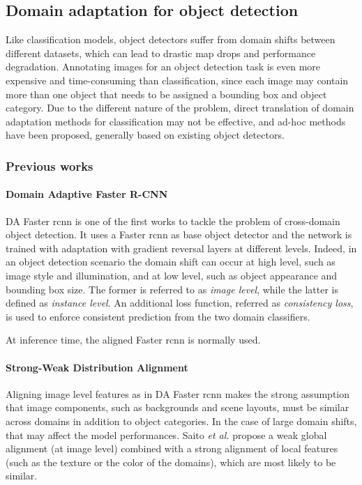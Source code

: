 \documentclass[%
    corpo=12pt,
    twoside,
    stile=classica,   
    tipotesi=magistrale,
    evenboxes,
    english
]{toptesi}
\begin{document}
\subsection{Domain adaptation for object detection}
Like classification models, object detectors suffer from domain shifts between different datasets, which can lead to drastic \gls{map} drops and performance degradation. Annotating images for an object detection task is even more expensive and time-consuming than classification, since each image may contain more than one object that needs to be assigned a bounding box and object category. Due to the different nature of the problem, direct translation of domain adaptation methods for classification may not be effective, and ad-hoc methods have been proposed, generally based on existing object detectors.

\subsubsection{Previous works}
\paragraph{Domain Adaptive Faster R-CNN}\label{sec:dafrcnn}
DA Faster \acrshort{rcnn}\cite{chen2018domain} is one of the first works to tackle the problem of cross-domain object detection. It uses a Faster \acrshort{rcnn} as base object detector and the network is trained with adaptation with gradient reversal layers at different levels. Indeed, in an object detection scenario the domain shift can occur at high level, such as image style and illumination, and at low level, such as object appearance and bounding box size. The former is referred to as \textit{image level}, while the latter is defined as \textit{instance level}. An additional loss function, referred as \textit{consistency loss}, is used to enforce consistent prediction from the two domain classifiers.

At inference time, the aligned Faster \gls{rcnn} is normally used.

\paragraph{Strong-Weak Distribution Alignment}
Aligning image level features as in DA Faster \acrshort{rcnn} makes the strong assumption that image components, such as backgrounds and scene layouts, must be similar across domains in addition to object categories. In the case of large domain shifts, that may affect the model performances. Saito \emph{et al.}\cite{saito2019strongweak} propose a weak global alignment (at image level) combined with a strong alignment of local features (such as the texture or the color of the domains), which are most likely to be similar.
\end{document}
